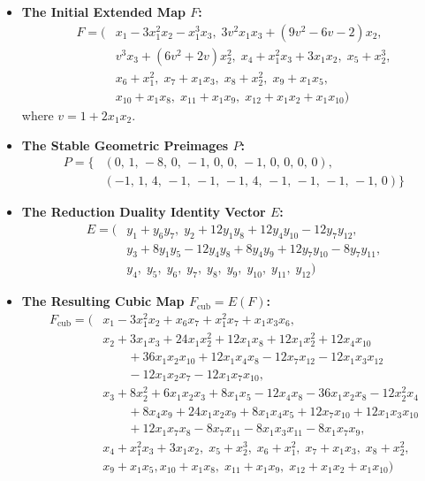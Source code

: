 \documentclass[11pt,a4paper]{article}
\begin{document}
\begin{itemize}
    \item \textbf{The Initial Extended Map $F$:}
    \begin{align*}
    F = \big( & x_1 - 3x_1^2x_2 - x_1^3x_3, \; 3v^2x_1x_3 + (9v^2-6v-2)x_2, \\
    & v^3x_3 + (6v^2+2v)x_2^2, \; x_4 + x_1^2x_3 + 3x_1x_2, \; x_5 + x_2^3, \\
    & x_6 + x_1^2, \; x_7 + x_1x_3, \; x_8 + x_2^2, \; x_9 + x_1x_5, \\ 
    & x_{10} + x_1x_8, \; x_{11} + x_1x_9, \; x_{12} + x_1x_2 + x_1x_{10} \big)
    \end{align*}
    where $v = 1 + 2x_1x_2$.
    
    \item \textbf{The Stable Geometric Preimages $P$:}
    \begin{align*}
    P = \big\{ & (0, \, 1, \, -8, \, 0, \, -1, \, 0, \, 0, \, -1, \, 0, \, 0, \, 0, \, 0), \\
               & (-1, \, 1, \, 4, \, -1, \, -1, \, -1, \, 4, \, -1, \, -1, \, -1, \, -1, \, 0) \big\}
    \end{align*}
    
    \item \textbf{The Reduction Duality Identity Vector $E$:}
    \begin{align*}
    E = \big( & y_1 + y_6y_7, \; y_2 + 12y_1y_8 + 12y_4y_{10} - 12y_7y_{12}, \\
              & y_3 + 8y_1y_5 - 12y_4y_8 + 8y_4y_9 + 12y_7y_{10} - 8y_7y_{11}, \\
              & y_4, \; y_5, \; y_6, \; y_7, \; y_8, \; y_9, \; y_{10}, \; y_{11}, \; y_{12} \big)
    \end{align*}
    
    \item \textbf{The Resulting Cubic Map $F_{\text{cub}} = E(F)$:}
    \begin{align*}
    F_{\text{cub}} = \big( & x_1 - 3x_1^2x_2 + x_6x_7 + x_1^2x_7 + x_1x_3x_6, \\
    & x_2 + 3x_1x_3 + 24x_1x_2^2 + 12x_1x_8 + 12x_1x_2^2 + 12x_4x_{10} \\
    & \qquad + 36x_1x_2x_{10} + 12x_1x_4x_8 - 12x_7x_{12} - 12x_1x_3x_{12} \\
    & \qquad - 12x_1x_2x_7 - 12x_1x_7x_{10}, \\
    & x_3  + 8x_2^2 + 6x_1x_2x_3 + 8x_1x_5 - 12x_4x_8 - 36x_1x_2x_8 - 12x_2^2x_4 \\
    & \qquad + 8x_4x_9 + 24x_1x_2x_9 + 8x_1x_4x_5 + 12x_7x_{10} + 12x_1x_3x_{10} \\
    & \qquad + 12x_1x_7x_8 - 8x_7x_{11} - 8x_1x_3x_{11} - 8x_1x_7x_9, \\
    & x_4 + x_1^2x_3 + 3x_1x_2, \; x_5 + x_2^3, \; x_6 + x_1^2, \; x_7 + x_1x_3, \; x_8 + x_2^2, \\
    & x_9 + x_1x_5, x_{10} + x_1x_8, \; x_{11} + x_1x_9, \; x_{12} + x_1x_2 + x_1x_{10} \big) 
    \end{align*}
\end{itemize}
\end{document}
